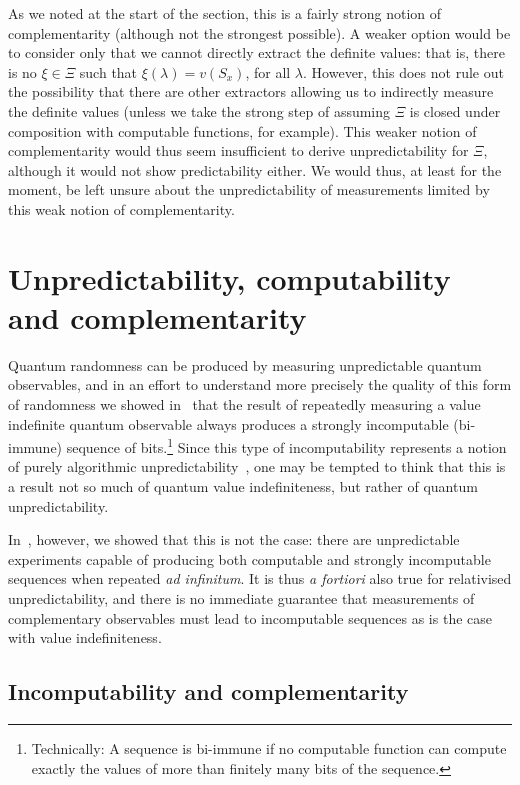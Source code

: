 \documentclass[information,article,submit,moreauthors,pdftex,12pt,a4paper]{mdpi}
\theoremstyle{mdpi}
\newcounter{thm}
\newcounter{ex}
\newcounter{re}
\theoremstyle{mdpidefinition}
\begin{document}
As we noted at the start of the section, this is a fairly strong notion of complementarity (although not the strongest possible).
A weaker option would be to consider only that we cannot directly extract the definite values: that is, there is no $\xi\in\Xi$ such that $\xi(\lambda)=v(S_x)$, for all $\lambda$.
However, this does not rule out the possibility that there are other extractors allowing us to indirectly measure the definite values (unless we take the strong step of assuming $\Xi$ is closed under composition with computable functions, for example).
This weaker notion of complementarity would thus seem insufficient to derive unpredictability for $\Xi$, although it would not show predictability either.
We would thus, at least for the moment, be left unsure about the unpredictability of measurements limited by this weak notion of complementarity.

\section{Unpredictability, computability and complementarity}

Quantum randomness can be produced by measuring unpredictable quantum observables, and in an effort to understand more precisely the quality of this
form of randomness we showed in~\cite{2012-incomput-proofsCJ} that the result of repeatedly measuring a value indefinite quantum observable always produces a strongly incomputable (bi-immune) sequence of
bits.\footnote{Technically: A sequence
is bi-immune if
no computable function can compute exactly the values of more than finitely many bits of the sequence.}
Since this type of incomputability represents a notion of purely algorithmic unpredictability~\cite{DBLP:conf/birthday/AbbottCS15}, one may be tempted to think that this is a result not so much of quantum value indefiniteness, but rather of quantum unpredictability.

In~\cite{DBLP:conf/birthday/AbbottCS15}, however, we showed that this is not the case: there are  unpredictable experiments capable of producing both computable and strongly incomputable sequences when repeated \emph{ad infinitum}.
It is thus \emph{a fortiori} also true for relativised unpredictability, and there is no immediate guarantee that measurements of complementary observables must lead to incomputable sequences as is the case with value indefiniteness.

\subsection{Incomputability and complementarity}
\label{sec:ic}
\end{document}
